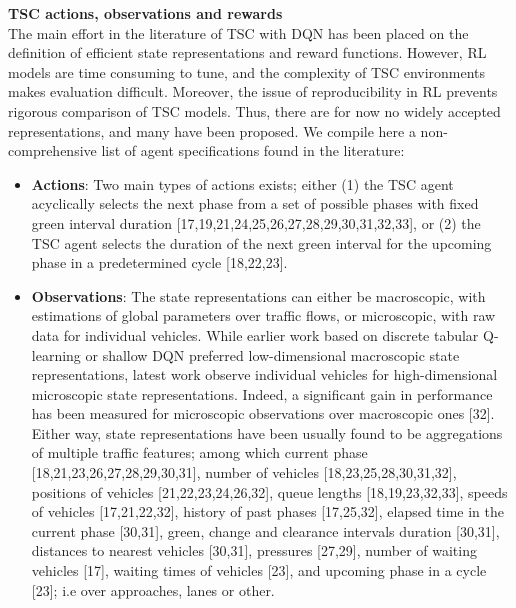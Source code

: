 \textbf{TSC actions, observations and rewards} \\
The main effort in the literature of TSC with DQN has been placed on the definition of efficient state representations and reward functions. However, RL models are time consuming to tune, and the complexity of TSC environments makes evaluation difficult. Moreover, the issue of reproducibility in RL prevents rigorous comparison of TSC models. Thus, there are for now no widely accepted representations, and many have been proposed. We compile here a non-comprehensive list of agent specifications found in the literature:
\begin{itemize}
\setlength\itemsep{-0.5em}
  \item \textbf{Actions}: Two main types of actions exists; either (1) the TSC agent acyclically selects the next phase from a set of possible phases with fixed green interval duration [17,19,21,24,25,26,27,28,29,30,31,32,33], or (2) the TSC agent selects the duration of the next green interval for the upcoming phase in a predetermined cycle [18,22,23].
  \item \textbf{Observations}: The state representations can either be macroscopic, with estimations of global parameters over traffic flows, or microscopic, with raw data for individual vehicles. While earlier work based on discrete tabular Q-learning or shallow DQN preferred low-dimensional macroscopic state representations, latest work observe individual vehicles for high-dimensional microscopic state representations. Indeed, a significant gain in performance has been measured for microscopic observations over macroscopic ones [32]. Either way, state representations have been usually found to be aggregations of multiple traffic features; among which current phase [18,21,23,26,27,28,29,30,31], number of vehicles [18,23,25,28,30,31,32], positions of vehicles [21,22,23,24,26,32], queue lengths [18,19,23,32,33], speeds of vehicles [17,21,22,32], history of past phases [17,25,32], elapsed time in the current phase [30,31], green, change and clearance intervals duration [30,31], distances to nearest vehicles [30,31], pressures [27,29], number of waiting vehicles [17], waiting times of vehicles [23], and upcoming phase in a cycle [23]; i.e over approaches, lanes or other.

\end{itemize}
